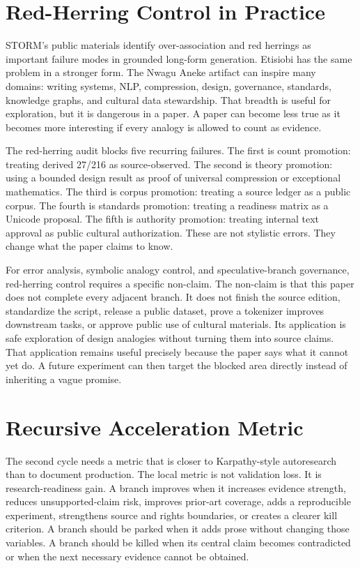 \documentclass[sigconf,nonacm]{acmart}
\begin{document}
\section{Red-Herring Control in Practice}
STORM's public materials identify over-association and red herrings as important
failure modes in grounded long-form generation. Etisiobi has the same problem in
a stronger form. The Nwagu Aneke artifact can inspire many domains: writing
systems, NLP, compression, design, governance, standards, knowledge graphs, and
cultural data stewardship. That breadth is useful for exploration, but it is
dangerous in a paper. A paper can become less true as it becomes more
interesting if every analogy is allowed to count as evidence.

The red-herring audit blocks five recurring failures. The first is count
promotion: treating derived 27/216 as source-observed. The second is theory
promotion: using a bounded design result as proof of universal compression or
exceptional mathematics. The third is corpus promotion: treating a source
ledger as a public corpus. The fourth is standards promotion: treating a
readiness matrix as a Unicode proposal. The fifth is authority promotion:
treating internal text approval as public cultural authorization. These are not
stylistic errors. They change what the paper claims to know.

For error analysis, symbolic analogy control, and speculative-branch governance, red-herring control requires a specific non-claim. The non-claim is
that this paper does not complete every adjacent branch. It does not finish the
source edition, standardize the script, release a public dataset, prove a
tokenizer improves downstream tasks, or approve public use of cultural
materials. Its application is safe exploration of design analogies without turning them into source claims. That application remains useful
precisely because the paper says what it cannot yet do. A future experiment can
then target the blocked area directly instead of inheriting a vague promise.

\section{Recursive Acceleration Metric}
The second cycle needs a metric that is closer to Karpathy-style autoresearch
than to document production. The local metric is not validation loss. It is
research-readiness gain. A branch improves when it increases evidence strength,
reduces unsupported-claim risk, improves prior-art coverage, adds a reproducible
experiment, strengthens source and rights boundaries, or creates a clearer kill
criterion. A branch should be parked when it adds prose without changing those
variables. A branch should be killed when its central claim becomes contradicted
or when the next necessary evidence cannot be obtained.
\end{document}
